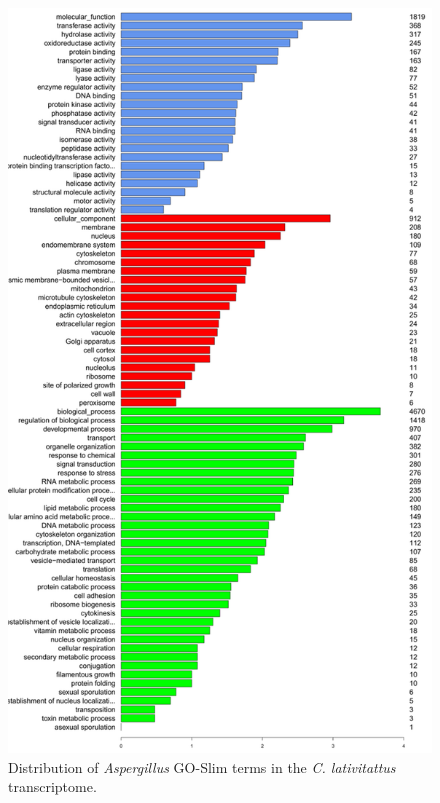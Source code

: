 \begin{figure}[tp]
  \includegraphics{./Chapter_Coelomomyces/img/Clat_aspergillus_GOPlot.png}
  \caption[\textit{C. lat} transcriptome GO term distribution]{Distribution of \textit{Aspergillus} GO-Slim terms in the \textit{C. lativitattus} transcriptome.}
  \label{fig:ChClat_GOPlot}
\end{figure}

